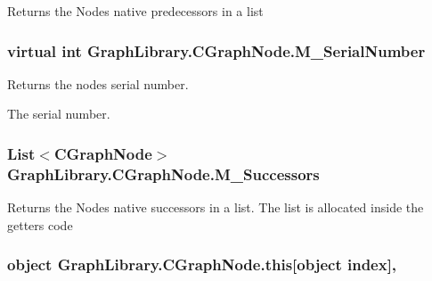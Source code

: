 Returns the Node\textquotesingle{}s native predecessors in a list 

\hypertarget{class_graph_library_1_1_c_graph_node_a43e9c4162fb28defd6c0193f2222d199}{}
\subsubsection[{M\+\_\+\+Serial\+Number}]{\setlength{\rightskip}{0pt plus 5cm}virtual int Graph\+Library.\+C\+Graph\+Node.\+M\+\_\+\+Serial\+Number\hspace{0.3cm}{\ttfamily [get]}}\label{class_graph_library_1_1_c_graph_node_a43e9c4162fb28defd6c0193f2222d199}


Returns the node\textquotesingle{}s serial number. 

The serial number. \hypertarget{class_graph_library_1_1_c_graph_node_a5f3bca4eb56bce992ef018820bdd20c4}{}
\subsubsection[{M\+\_\+\+Successors}]{\setlength{\rightskip}{0pt plus 5cm}List$<${\bf C\+Graph\+Node}$>$ Graph\+Library.\+C\+Graph\+Node.\+M\+\_\+\+Successors\hspace{0.3cm}{\ttfamily [get]}}\label{class_graph_library_1_1_c_graph_node_a5f3bca4eb56bce992ef018820bdd20c4}


Returns the Node\textquotesingle{}s native successors in a list. The list is allocated inside the getter\textquotesingle{}s code 

\hypertarget{class_graph_library_1_1_c_graph_node_a2e5ed7afca428365f7aef68611f852fe}{}
\subsubsection[{this[object index]}]{\setlength{\rightskip}{0pt plus 5cm}object Graph\+Library.\+C\+Graph\+Node.\+this\mbox{[}object index\mbox{]}\hspace{0.3cm}{\ttfamily [get]}, {\ttfamily [set]}}\label{class_graph_library_1_1_c_graph_node_a2e5ed7afca428365f7aef68611f852fe}


